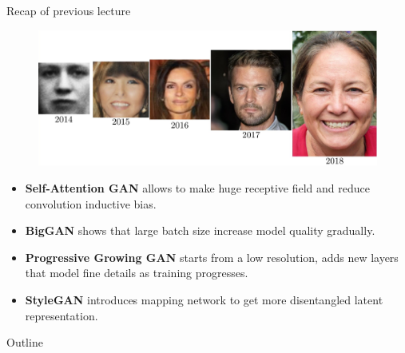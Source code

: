 \begin{frame}{Recap of previous lecture}
	\begin{figure}
		\centering
		\includegraphics[width=\linewidth]{figs/gan_evolution}
	\end{figure}
	\begin{itemize}
		\item \textbf{Self-Attention GAN} allows to make huge receptive field and reduce convolution inductive bias.
		\item \textbf{BigGAN} shows that large batch size increase model quality gradually.
		\item \textbf{Progressive Growing GAN} starts from a low resolution, adds new layers that model fine details as training progresses.
		\item \textbf{StyleGAN} introduces mapping network to get more disentangled latent representation.
	\end{itemize}
\end{frame}
\begin{frame}{Outline}
	\tableofcontents
\end{frame}

